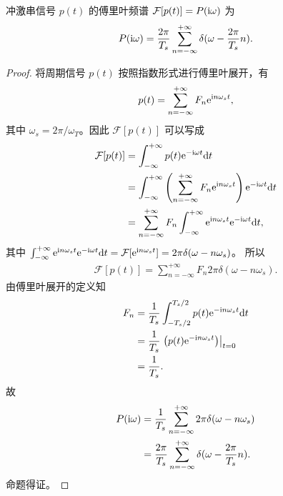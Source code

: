 \begin{property}
    冲激串信号 $p(t)$ 的傅里叶频谱 $\mathcal{F}[p(t)] = P(\mathrm{i} \omega)$ 为
    \begin{align*}
        P(\mathrm{i} \omega) = \frac{2\pi}{T_s}\sum_{n = -\infty}^{+\infty}\delta(\omega - \frac{2\pi}{T_s}n).
    \end{align*}
    \label{property:impulse-sampling-frequency-1}
\end{property}

\begin{proof}
    将周期信号 $p(t)$ 按照指数形式进行傅里叶展开，有
    \begin{align*}
        p(t) = \sum_{n = -\infty}^{+\infty}F_n\mathrm{e}^{\mathrm{i} n\omega_s t},
    \end{align*}
    其中 $\omega_s = 2\pi/\omega_T$。因此 $\mathcal{F}[p(t)]$ 可以写成
    \begin{align*}
        \mathcal{F}[p(t)] & = \int_{-\infty}^{+\infty}p(t)\mathrm{e}^{-\mathrm{i}\omega t}\mathrm{d}t \\
        & = \int_{-\infty}^{+\infty}\left(\sum_{n = -\infty}^{+\infty}F_n\mathrm{e}^{\mathrm{i} n\omega_s t}\right)\mathrm{e}^{-\mathrm{i}\omega t}\mathrm{d}t \\
        & = \sum_{n = -\infty}^{+\infty}F_n\int_{-\infty}^{+\infty}\mathrm{e}^{\mathrm{i} n\omega_s t}\mathrm{e}^{-\mathrm{i}\omega t}\mathrm{d}t,
    \end{align*}
    其中 $\int_{-\infty}^{+\infty}\mathrm{e}^{\mathrm{i} n\omega_s t}\mathrm{e}^{-\mathrm{i}\omega t}\mathrm{d}t
        = \mathcal{F}[\mathrm{e}^{\mathrm{i} n\omega_s t}] = 2\pi\delta(\omega - n\omega_s)$。
    所以
    \begin{align*}
        \mathcal{F}[p(t)] = \sum_{n = -\infty}^{+\infty}F_n2\pi\delta(\omega - n\omega_s).
    \end{align*}
    由傅里叶展开的定义知
    \begin{align*}
        F_n & = \frac{1}{T_s}\int_{-T_s/2}^{T_s/2}p(t)\mathrm{e}^{-\mathrm{i} n\omega_s t}\mathrm{d}t \\
        & = \frac{1}{T_s}\left.\left(p(t)\mathrm{e}^{-\mathrm{i} n\omega_s t}\right)\right|_{t = 0} \\
        & = \frac{1}{T_s}.
    \end{align*}
    故
    \begin{align*}
        P(\mathrm{i} \omega) & = \frac{1}{T_s}\sum_{n = -\infty}^{+\infty}2\pi\delta(\omega - n\omega_s) \\
        & = \frac{2\pi}{T_s}\sum_{n = -\infty}^{+\infty}\delta(\omega - \frac{2\pi}{T_s}n).
    \end{align*}
    命题得证。
\end{proof}

